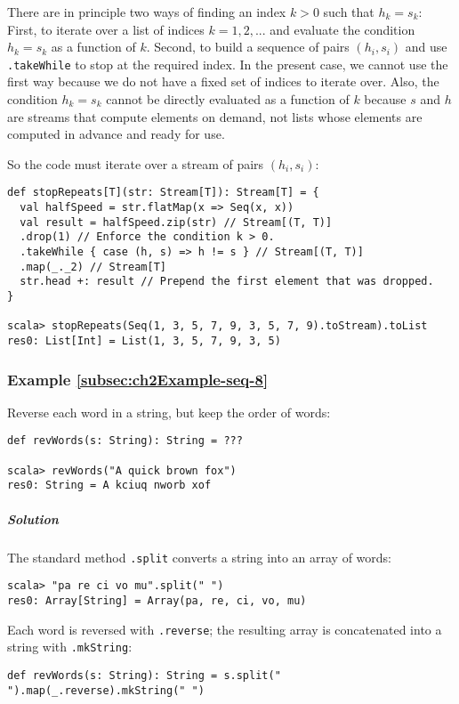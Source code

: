 There are in principle two ways of finding an index $k>0$ such that
$h_{k}=s_{k}$: First, to iterate over a list of indices $k=1,2,...$
and evaluate the condition $h_{k}=s_{k}$ as a function of $k$. Second,
to build a sequence of pairs $\left(h_{i},s_{i}\right)$ and use \lstinline!.takeWhile!
to stop at the required index. In the present case, we cannot use
the first way because we do not have a fixed set of indices to iterate
over. Also, the condition $h_{k}=s_{k}$ cannot be directly evaluated
as a function of $k$ because $s$ and $h$ are streams that compute
elements on demand, not lists whose elements are computed in advance
and ready for use. 

So the code must iterate over a stream of pairs $\left(h_{i},s_{i}\right)$:
\begin{lstlisting}
def stopRepeats[T](str: Stream[T]): Stream[T] = {
  val halfSpeed = str.flatMap(x => Seq(x, x))
  val result = halfSpeed.zip(str) // Stream[(T, T)]
  .drop(1) // Enforce the condition k > 0.
  .takeWhile { case (h, s) => h != s } // Stream[(T, T)]
  .map(_._2) // Stream[T]
  str.head +: result // Prepend the first element that was dropped.
}

scala> stopRepeats(Seq(1, 3, 5, 7, 9, 3, 5, 7, 9).toStream).toList
res0: List[Int] = List(1, 3, 5, 7, 9, 3, 5)
\end{lstlisting}


\subsubsection{Example \label{subsec:ch2Example-seq-8}\ref{subsec:ch2Example-seq-8}}

Reverse each word in a string, but keep the order of words:
\begin{lstlisting}
def revWords(s: String): String = ???

scala> revWords("A quick brown fox")
res0: String = A kciuq nworb xof
\end{lstlisting}


\subparagraph{Solution}

The standard method \lstinline!.split! converts a string into an
array of words:
\begin{lstlisting}
scala> "pa re ci vo mu".split(" ")
res0: Array[String] = Array(pa, re, ci, vo, mu)
\end{lstlisting}
Each word is reversed with \lstinline!.reverse!; the resulting array
is concatenated into a string with \lstinline!.mkString!:
\begin{lstlisting}
def revWords(s: String): String = s.split(" ").map(_.reverse).mkString(" ")
\end{lstlisting}


